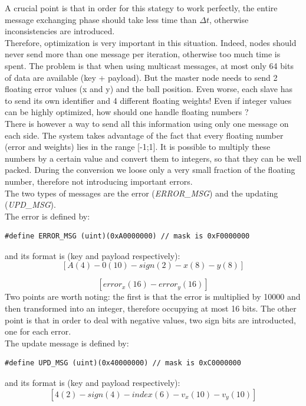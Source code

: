 \documentclass{article}
\begin{document}
A crucial point is that in order for this stategy to work perfectly, the entire message exchanging phase should take less time than \(\Delta t \), otherwise inconsistencies are introduced. \\

Therefore, optimization is very important in this situation. Indeed, nodes should never send more than one message per iteration, otherwise too much time is spent. The problem is that when using multicast messages, at most only 64 bits of data are available (key + payload). But the master node needs to send 2 floating error values (x and y) and the ball position. Even worse, each slave has to send its own identifier and 4 different floating weights! Even if integer values can be highly optimized, how should one handle floating numbers ?\\
There is however a way to send all this information using only one message on each side. The system takes advantage of the fact that every floating number (error and weights) lies in the range [-1;1]. It is possible to multiply these numbers by a certain value and convert them to integers, so that they can be well packed. During the conversion we loose only a very small fraction of the floating number, therefore not introducing important errors.\\

The two types of messages are the error (\textit{ERROR\_MSG}) and the updating (\textit{UPD\_MSG}).\\

The error is defined by:
\begin{verbatim}
#define ERROR_MSG (uint)(0xA0000000) // mask is 0xF0000000
\end{verbatim}
and its format is (key and payload respectively):
\[
[ A (4) - 0 (10) - sign (2) - x (8) - y (8)] 
\]

\[
[ error_x (16) - error_y (16) ]
\]
Two points are worth noting: the first is that the error is multiplied by 10000 and then transformed into an integer, therefore occupying at most 16 bits. The other point is that in order to deal with negative values, two sign bits are introducted, one for each error.\\

The update message is defined by:
\begin{verbatim}
#define UPD_MSG (uint)(0x40000000) // mask is 0xC0000000
\end{verbatim}
and its format is (key and payload respectively):
\[
[ 4 (2) - sign (4) - index (6) - v_x (10) - v_y (10)]
\]
\end{document}
